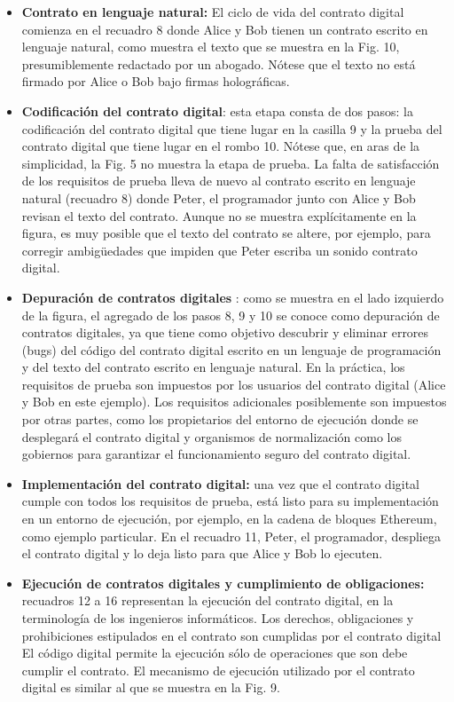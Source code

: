 \documentclass[12pt]{report} %
\begin{document}
\begin{itemize}
\begin{itemize}
    \item \textbf{Contrato en lenguaje natural:} El ciclo de vida del contrato digital comienza en el recuadro 8 donde Alice y Bob tienen un contrato escrito en lenguaje natural, como muestra el texto que se muestra en la Fig. 10, presumiblemente redactado por un abogado. Nótese que el texto no está firmado por Alice o Bob bajo firmas holográficas.
    \item \textbf{Codificación del contrato digital}: esta etapa consta de dos pasos: la codificación del contrato digital que tiene lugar en la casilla 9 y la prueba del contrato digital que tiene lugar en el rombo 10. Nótese que, en aras de la simplicidad, la Fig. 5 no muestra la etapa de prueba. La falta de satisfacción de los requisitos de prueba lleva de nuevo al contrato escrito en lenguaje natural (recuadro 8) donde Peter, el programador junto con Alice y Bob revisan el texto del contrato. Aunque no se muestra explícitamente en la figura, es muy posible que el texto del contrato se altere, por ejemplo, para corregir ambigüedades que impiden que Peter escriba un sonido contrato digital.

     \item \textbf{Depuración de contratos digitales} : como se muestra en el lado izquierdo de la figura, el agregado de los pasos 8, 9 y 10 se conoce como depuración de contratos digitales, ya que tiene como objetivo descubrir y eliminar errores (bugs) del código del contrato digital escrito en un lenguaje de programación y del texto del contrato escrito en lenguaje natural. En la práctica, los requisitos de prueba son impuestos por los usuarios del contrato digital (Alice y Bob en este ejemplo). Los requisitos adicionales posiblemente son impuestos por otras partes, como los propietarios del entorno de ejecución donde se desplegará el contrato digital y organismos de normalización como los gobiernos para garantizar el funcionamiento seguro del contrato digital.
     \item \textbf{Implementación del contrato digital: }una vez que el contrato digital cumple con todos los requisitos de prueba, está listo para su implementación en un entorno de ejecución, por ejemplo, en la cadena de bloques Ethereum, como ejemplo particular. En el recuadro 11, Peter, el programador, despliega el contrato digital y lo deja listo para que Alice y Bob lo ejecuten.
     \item\textbf{Ejecución de contratos digitales y cumplimiento de obligaciones:}
     recuadros 12 a 16 representan la ejecución del contrato digital, en la terminología de los ingenieros informáticos. Los derechos, obligaciones y prohibiciones estipulados en el contrato son cumplidas por el contrato digital El código digital permite la ejecución sólo de operaciones que son debe cumplir el contrato. El mecanismo de ejecución utilizado por el contrato digital es similar al que se muestra en la Fig. 9.


\end{itemize}
\end{itemize}
\end{document}
